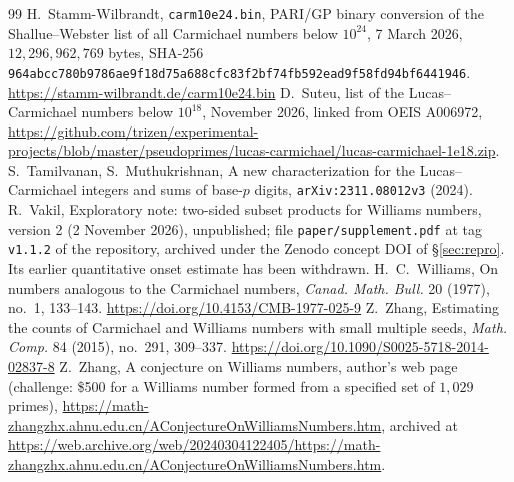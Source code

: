 \documentclass[11pt]{amsart}
\theoremstyle{definition}
\theoremstyle{remark}
\begin{document}
\begin{thebibliography}{99}
 H.~Stamm-Wilbrandt, \texttt{carm10e24.bin}, PARI/GP binary conversion of the Shallue--Webster list of all Carmichael numbers below $10^{24}$, 7 March 2026, $12{,}296{,}962{,}769$ bytes, SHA-256 \texttt{964abcc780b9786ae9f18d75a688cfc83f2bf74fb592ead9f58fd94bf6441946}. \url{https://stamm-wilbrandt.de/carm10e24.bin}
 D.~Suteu, list of the Lucas--Carmichael numbers below $10^{18}$, November 2026, linked from OEIS A006972, \url{https://github.com/trizen/experimental-projects/blob/master/pseudoprimes/lucas-carmichael/lucas-carmichael-1e18.zip}.
 S.~Tamilvanan, S.~Muthukrishnan, A new characterization for the Lucas--Carmichael integers and sums of base-$p$ digits, \texttt{arXiv:2311.08012v3} (2024).
 R.~Vakil, Exploratory note: two-sided subset products for Williams numbers, version 2 (2 November 2026), unpublished; file \texttt{paper/supplement.pdf} at tag \texttt{v1.1.2} of the repository, archived under the Zenodo concept DOI of \S\ref{sec:repro}. Its earlier quantitative onset estimate has been withdrawn.
 H.~C.~Williams, On numbers analogous to the Carmichael numbers, \emph{Canad. Math. Bull.} 20 (1977), no.~1, 133--143. \url{https://doi.org/10.4153/CMB-1977-025-9}
 Z.~Zhang, Estimating the counts of Carmichael and Williams numbers with small multiple seeds, \emph{Math. Comp.} 84 (2015), no.~291, 309--337. \url{https://doi.org/10.1090/S0025-5718-2014-02837-8}
 Z.~Zhang, A conjecture on Williams numbers, author's web page (challenge: \$500 for a Williams number formed from a specified set of $1{,}029$ primes), \url{https://math-zhangzhx.ahnu.edu.cn/AConjectureOnWilliamsNumbers.htm}, archived at \url{https://web.archive.org/web/20240304122405/https://math-zhangzhx.ahnu.edu.cn/AConjectureOnWilliamsNumbers.htm}.
\end{thebibliography}
\end{document}
